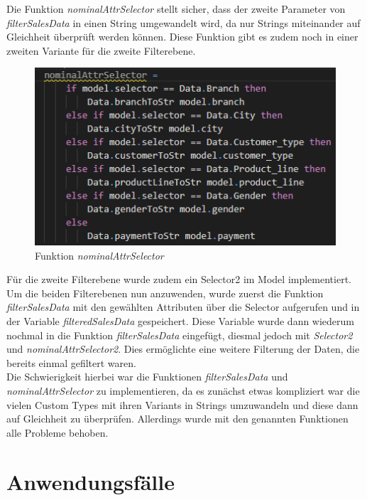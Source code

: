 \documentclass[usegeometry=true]{scrartcl}
\begin{document}
\noindent Die Funktion \textit{nominalAttrSelector} stellt sicher, dass der zweite Parameter von \textit{filterSalesData} in einen String umgewandelt wird, da nur Strings miteinander
auf Gleichheit überprüft werden können. Diese Funktion gibt es zudem noch in einer zweiten Variante für die zweite Filterebene.
\begin{figure} [H]
	\begin{center}
		\includegraphics[width=12cm]{IMG/nominalAttrSelector}
		\caption{Funktion \textit{nominalAttrSelector}}
		\label{fig:nominalAttrSelector}
	\end{center}
\end{figure}

\noindent Für die zweite Filterebene wurde zudem ein Selector2 im Model implementiert. Um die beiden Filterebenen nun anzuwenden, wurde zuerst die Funktion \textit{filterSalesData} mit
den gewählten Attributen über die Selector aufgerufen und in der Variable \textit{filteredSalesData} gespeichert. Diese Variable wurde dann wiederum nochmal in die Funktion
\textit{filterSalesData} eingefügt, diesmal jedoch mit \textit{Selector2} und \textit{nominalAttrSelector2}. Dies ermöglichte eine weitere Filterung der Daten, die bereits
einmal gefiltert waren.\\
\noindent Die Schwierigkeit hierbei war die Funktionen \textit{filterSalesData} und \textit{nominalAttrSelector} zu implementieren, da es zunächst etwas kompliziert war die
vielen Custom Types mit ihren Variants in Strings umzuwandeln und diese dann auf Gleichheit zu überprüfen. Allerdings wurde mit den genannten Funktionen alle Probleme behoben.

\section{Anwendungsfälle}
\end{document}
